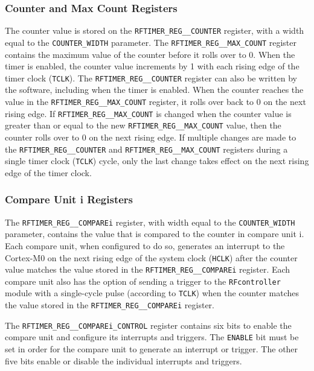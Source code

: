 \subsubsection{Counter and Max Count Registers}
The counter value is stored on the \texttt{RFTIMER\_REG\_\_COUNTER} register, with a width equal to the \texttt{COUNTER\_WIDTH} parameter. The \texttt{RFTIMER\_REG\_\_MAX\_COUNT} register contains the maximum value of the counter before it rolls over to 0. When the timer is enabled, the counter value increments by 1 with each rising edge of the timer clock (\texttt{TCLK}). The \texttt{RFTIMER\_REG\_\_COUNTER} register can also be written by the software, including when the timer is enabled. When the counter reaches the value in the \texttt{RFTIMER\_REG\_\_MAX\_COUNT} register, it rolls over back to 0 on the next rising edge. If \texttt{RFTIMER\_REG\_\_MAX\_COUNT} is changed when the counter value is greater than or equal to the new \texttt{RFTIMER\_REG\_\_MAX\_COUNT} value, then the counter rolls over to 0 on the next rising edge. If multiple changes are made to the \texttt{RFTIMER\_REG\_\_COUNTER} and \texttt{RFTIMER\_REG\_\_MAX\_COUNT} registers during a single timer clock (\texttt{TCLK}) cycle, only the last change takes effect on the next rising edge of the timer clock.

\subsubsection{Compare Unit i Registers}
The \texttt{RFTIMER\_REG\_\_COMPAREi} register, with width equal to the \texttt{COUNTER\_WIDTH} parameter, contains the value that is compared to the counter in compare unit i. Each compare unit, when configured to do so, generates an interrupt to the Cortex-M0 on the next rising edge of the system clock (\texttt{HCLK}) after the counter value matches the value stored in the \texttt{RFTIMER\_REG\_\_COMPAREi} register. Each compare unit also has the option of sending a trigger to the \texttt{RFcontroller} module with a single-cycle pulse (according to \texttt{TCLK}) when the counter matches the value stored in the \texttt{RFTIMER\_REG\_\_COMPAREi} register.

The \texttt{RFTIMER\_REG\_\_COMPAREi\_CONTROL} register contains six bits to enable the compare unit and configure its interrupts and triggers. The \texttt{ENABLE} bit must be set in order for the compare unit to generate an interrupt or trigger. The other five bits enable or disable the individual interrupts and triggers.

